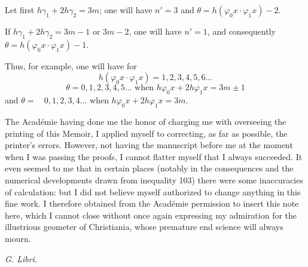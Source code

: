 \documentclass{article}
\begin{document}
Let first $h\gamma_1+2h\gamma_2 = 3m$; one will have $n'=3$ and $\theta = h(\varphi_0 x \cdot \varphi_1 x)-2$.

If $h\gamma_1+2h\gamma_2 = 3m-1$ or $3m-2$, one will have $n'=1$, and consequently $\theta = h(\varphi_0 x \cdot \varphi_1 x)-1$.

Thus, for example, one will have for
\[ h(\varphi_0 x \cdot \varphi_1 x) = 1, 2, 3, 4, 5, 6 \ldots \]
\[ \theta = 0, 1, 2, 3, 4, 5 \ldots \text{ when } h\varphi_0 x+2h\varphi_1 x = 3m \pm 1 \]
and $\theta = \phantom{0, }0, 1, 2, 3, 4 \ldots$ when $h\varphi_0 x+2h\varphi_1 x = 3m$.

The Académie having done me the honor of charging me with overseeing the printing of this Memoir, I applied myself to correcting, as far as possible, the printer's errors. However, not having the manuscript before me at the moment when I was passing the proofs, I cannot flatter myself that I always succeeded. It even seemed to me that in certain places (notably in the consequences and the numerical developments drawn from inequality 103) there were some inaccuracies of calculation: but I did not believe myself authorized to change anything in this fine work. I therefore obtained from the Académie permission to insert this note here, which I cannot close without once again expressing my admiration for the illustrious geometer of Christiania, whose premature end science will always mourn.

\emph{G. Libri.}
\end{document}
